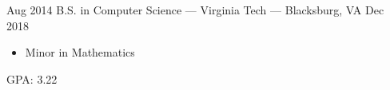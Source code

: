 
\begin{experiences}
	\experience
	{Aug 2014}   {B.S. in Computer Science --- Virginia Tech --- Blacksburg, VA}{}{}
	{Dec 2018}  { 
		\begin{itemize}
			\item Minor in Mathematics
		\end{itemize}
	}
	{GPA: 3.22}
	\emptySeparator
\end{experiences}